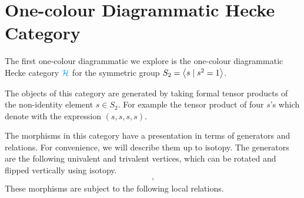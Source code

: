 \section{One-colour Diagrammatic Hecke Category}

The first one-colour diagrammatic we explore is the one-colour diagrammatic Hecke category $\blue\cH$ for the symmetric group $S_2 = {\left\langle s \mathrel{|} s^2 = 1 \right\rangle}$. %

The objects of this category are generated by taking formal tensor products of the non-identity element $s \in S_2$. For example the tensor product of four $s$'s which denote with the expression $(s,s,s,s)$.

The morphisms in this category have a presentation in terms of generators and relations. For convenience, we will describe them up to isotopy. %
The generators are the following univalent and trivalent vertices, which can be rotated and flipped vertically using isotopy.
\begin{align}
    
    \quad , \quad
    
\end{align}
These morphisms are subject to the following local relations.
